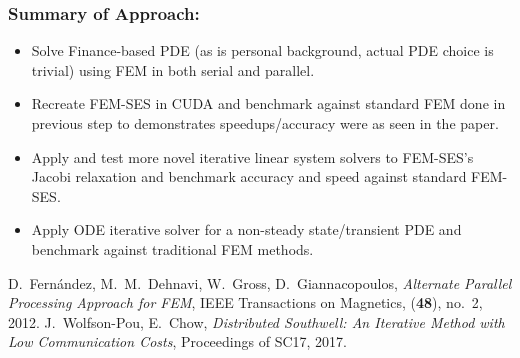 \documentclass[12pt]{article}
\begin{document}
\subsubsection*{Summary of Approach:}
\begin{itemize}
\item Solve Finance-based PDE (as is personal background, actual PDE choice is trivial) using FEM in both serial and parallel.
\item Recreate FEM-SES in CUDA and benchmark against standard FEM done in previous step to demonstrates speedups/accuracy were as seen in the paper.
\item Apply and test more novel iterative linear system solvers to FEM-SES's Jacobi relaxation and benchmark accuracy and speed against standard FEM-SES.
\item Apply ODE iterative solver for a non-steady state/transient PDE and benchmark against traditional FEM methods.
\end{itemize}
\begin{thebibliography}{9}
D.~Fernández, M.~M.~Dehnavi, W.~Gross, D.~Giannacopoulos, 
\textit{Alternate Parallel Processing Approach for FEM}, 
IEEE Transactions on Magnetics, (\textbf{48}), no.~2, 2012.
J.~Wolfson-Pou, E.~Chow,
\textit{Distributed Southwell: An Iterative Method with Low
Communication Costs}, 
Proceedings of SC17, 2017.
\end{thebibliography}
\end{document}
